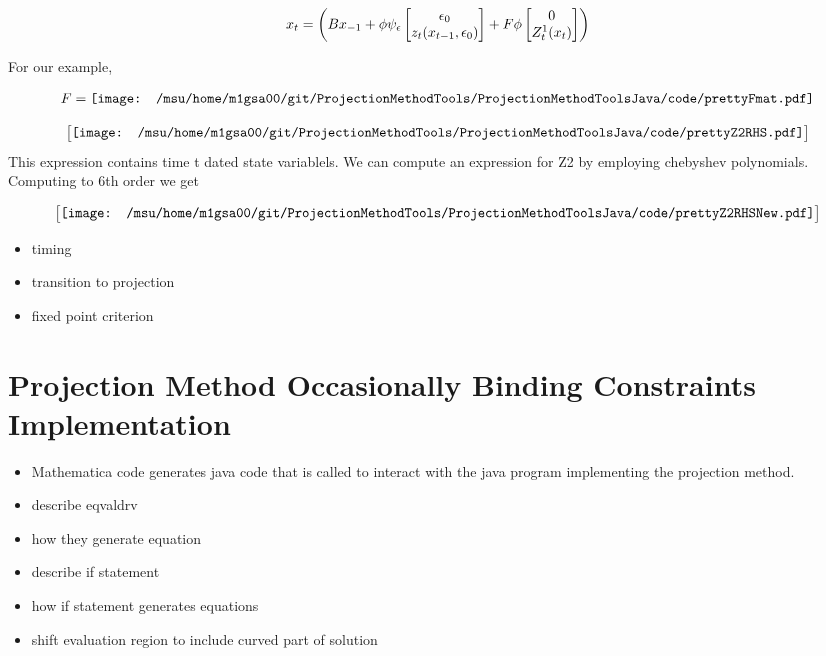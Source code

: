 \documentclass[12pt]{article}
\begin{document}
\begin{gather*}
  x_t=
\left (
B x_{-1} + \phi \psi_\epsilon \begin{bmatrix} \epsilon_0 \\z_{t}(x_{t-1},\epsilon_0) \end{bmatrix}+ F \phi \begin{bmatrix} 0 \\Z_t^1(x_{t}) \end{bmatrix}
\right )
\end{gather*}


For our example,



 \begin{gather*}
F=   \vcenter{\hbox{\texttt{[image: /msu/home/m1gsa00/git/ProjectionMethodTools/ProjectionMethodToolsJava/code/prettyFmat.pdf]}}}
 \end{gather*}




\begin{gather*}
\begin{bmatrix}
  \vcenter{\hbox{\texttt{[image: /msu/home/m1gsa00/git/ProjectionMethodTools/ProjectionMethodToolsJava/code/prettyZ2RHS.pdf]}}} 
\end{bmatrix}
\end{gather*}
This expression contains time t dated state variablels.
We can compute an expression for Z2 by employing chebyshev polynomials.
Computing to 6th order we get

\begin{gather*}
\begin{bmatrix}
  \vcenter{\hbox{\texttt{[image: /msu/home/m1gsa00/git/ProjectionMethodTools/ProjectionMethodToolsJava/code/prettyZ2RHSNew.pdf]}}} 
\end{bmatrix}
\end{gather*}


\begin{itemize}
\item timing
\item transition to projection
\item fixed point criterion
\end{itemize}





\section{Projection Method Occasionally Binding Constraints Implementation}
\label{sec:proj-meth-occass}
\begin{itemize}
\item Mathematica code generates java code that is called to interact with the java program implementing the projection method.
\item describe eqvaldrv
\item how they generate equation
\item describe if statement
\item how if statement generates equations
\item shift evaluation region to include curved part of solution
\end{itemize}
\end{document}
